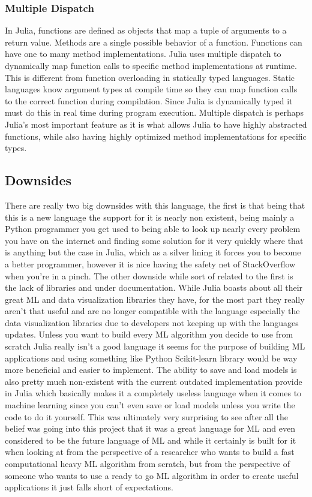 \documentclass{article}
\begin{document}
\subsubsection{Multiple Dispatch}
In Julia, functions are defined as objects that map a tuple of arguments to a return value. Methods are a single possible behavior of a function. Functions can have one to many method implementations. Julia uses multiple dispatch to dynamically map function calls to specific method implementations at runtime. This is different from function overloading in statically typed languages. Static languages know argument types at compile time so they can map function calls to the correct function during compilation. Since Julia is dynamically typed it must do this in real time during program execution. Multiple dispatch is perhaps Julia's most important feature as it is what allows Julia to have highly abstracted functions, while also having highly optimized method implementations for specific types.

\subsection{Downsides}
There are really two big downsides with this language, the first is that being that this is a new language the support for it is nearly non existent, being mainly a Python programmer you get used to being able to look up nearly every problem you have on the internet and finding some solution for it very quickly where that is anything but the case in Julia, which as a silver lining it forces you to become a better programmer, however it is nice having the safety net of StackOverflow when you're in a pinch. The other downside while sort of related to the first is the lack of libraries and under documentation. While Julia boasts about all their great ML and data visualization libraries they have, for the most part they really aren't that useful and are no longer compatible with the language especially the data visualization libraries due to developers not keeping up with the languages updates. Unless you want to build every ML algorithm you decide to use from scratch Julia really isn't a good language it seems for the purpose of building ML applications and using something like Python Scikit-learn library would be way more beneficial and easier to implement. The ability to save and load models is also pretty much non-existent with the current outdated implementation provide in Julia which basically makes it a completely useless language when it comes to machine learning since you can't even save or load models unless you write the code to do it yourself. This was ultimately very surprising to see after all the belief was going into this project that it was a great language for ML and even considered to be the future language of ML and while it certainly is built for it when looking at from the perspective of a researcher who wants to build a fast computational heavy ML algorithm from scratch, but from the perspective of someone who wants to use a ready to go ML algorithm in order to create useful applications it just falls short of expectations.
\end{document}
